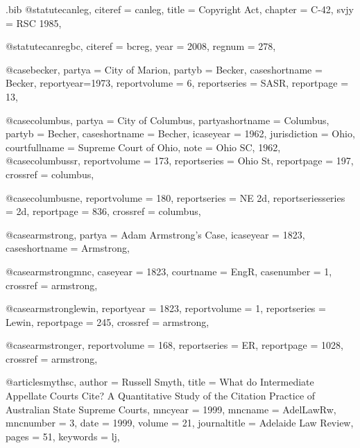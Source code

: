 \begin{filecontents*}[overwrite]{\jobname.bib}
@statute{canleg,
citeref = {canleg},
title = {Copyright Act},
chapter = {C-42},
svjy = {RSC 1985},
}



@statute{canregbc,
citeref = {bcreg},
year = {2008},
regnum = {278},
}

@case{becker,
  partya = {City of Marion}, 
  partyb = {Becker},
  caseshortname = {Becker},
  reportyear={1973},
  reportvolume = {6},
  reportseries = {SASR},
  reportpage = {13},
	}

@case{columbus,
  partya = {City of Columbus},
  partyashortname = {Columbus}, 
  partyb = {Becher},
  caseshortname = {Becher},
  icaseyear = {1962},
  jurisdiction = {Ohio},
  courtfullname = {Supreme Court of Ohio},
  note = {Ohio SC, 1962},
	}
@case{columbussr,
  reportvolume = {173},
  reportseries = {Ohio St},
  reportpage = {197},
  crossref = {columbus},
}

@case{columbusne,
  reportvolume = {180},
  reportseries = {NE 2d},
  reportseriesseries = {2d},
  reportpage = {836},
  crossref = {columbus},
}

@case{armstrong,
  partya = {Adam Armstrong's Case},
  icaseyear = {1823},
  caseshortname = {Armstrong},
	}

@case{armstrongmnc,
  caseyear = {1823},
  courtname = {EngR},
  casenumber = {1},
  crossref = {armstrong},
}


@case{armstronglewin,
  reportyear = {1823},
  reportvolume = {1},
  reportseries = {Lewin},
  reportpage = {245},
  crossref = {armstrong},
}

@case{armstronger,
  reportvolume = {168},
  reportseries = {ER},
  reportpage = {1028},
  crossref = {armstrong},
}

@article{smythsc,
author = {Russell Smyth},
title = {What do Intermediate Appellate Courts Cite? A Quantitative Study of the Citation Practice of Australian State Supreme Courts},
mncyear = {1999},
mncname = {AdelLawRw},
mncnumber = {3},
date = {1999},
volume = {21},
journaltitle = {Adelaide Law Review},
pages = {51},
keywords = {lj},
}


\end{filecontents*}
